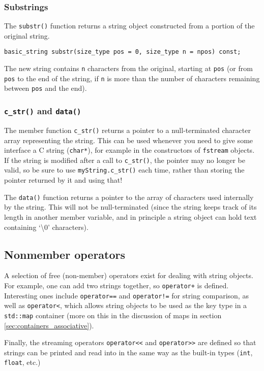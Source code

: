 \documentclass[a4paper]{scrartcl}
\begin{document}
\subsubsection{Substrings}
The \texttt{substr()} function returns a string object constructed from a portion of the original string.
\begin{verbatim}
basic_string substr(size_type pos = 0, size_type n = npos) const;
\end{verbatim}
The new string contains \texttt{n} characters from the original, starting at \texttt{pos} (or from \texttt{pos} to the end of the string, if \texttt{n} is more than the number of characters remaining between \texttt{pos} and the end).

\subsubsection{\texttt{c\_str()} and \texttt{data()}}
The member function \texttt{c\_str()} returns a pointer to a null-terminated character array representing the string. This can be used whenever you need to give some interface a C string (\texttt{char*}), for example in the constructors of \texttt{fstream} objects. If the string is modified after a call to \texttt{c\_str()}, the pointer may no longer be valid, so be sure to use \texttt{myString.c\_str()} each time, rather than storing the pointer returned by it and using that!

The \texttt{data()} function returns a pointer to the array of characters used internally by the string. This will not be null-terminated (since the string keeps track of its length in another member variable, and in principle a string object can hold text containing `\textbackslash 0' characters).

\subsection{Nonmember operators}
A selection of free (non-member) operators exist for dealing with string objects. For example, one can add two strings together, so \texttt{operator+} is defined. Interesting ones include \texttt{operator==} and \texttt{operator!=} for string comparison, as well as \texttt{operator<}, which allows string objects to be used as the key type in a \texttt{std::map} container (more on this in the discussion of maps in section \ref{sec:containers_associative}).

Finally, the streaming operators \verb|operator<<| and \verb|operator>>| are defined so that strings can be printed and read into in the same way as the built-in types (\texttt{int}, \texttt{float}, etc.)
\end{document}
